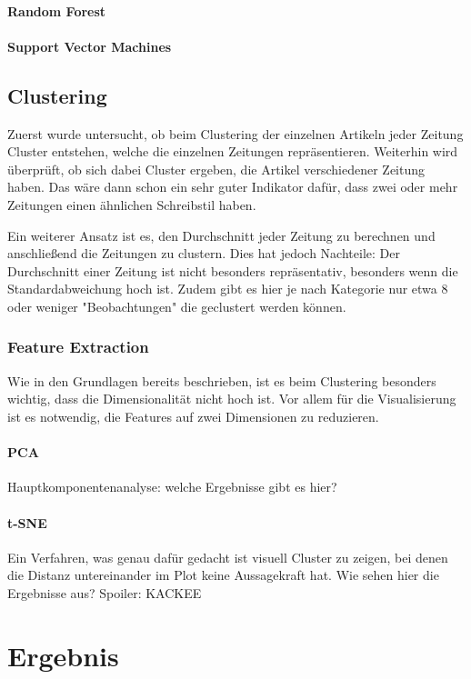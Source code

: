 \subsubsection*{Random Forest}
\subsubsection*{Support Vector Machines}
\section{Clustering}
Zuerst wurde untersucht, ob beim Clustering der einzelnen Artikeln jeder Zeitung Cluster entstehen, welche die einzelnen Zeitungen repräsentieren. Weiterhin wird überprüft, ob sich dabei Cluster ergeben, die Artikel verschiedener Zeitung haben. Das wäre dann schon ein sehr guter Indikator dafür, dass zwei oder mehr Zeitungen einen ähnlichen Schreibstil haben.

Ein weiterer Ansatz ist es, den Durchschnitt jeder Zeitung zu berechnen und anschließend die Zeitungen zu clustern. Dies hat jedoch Nachteile: Der Durchschnitt einer Zeitung ist nicht besonders repräsentativ, besonders wenn die Standardabweichung hoch ist. Zudem gibt es hier je nach Kategorie nur etwa 8 oder weniger "Beobachtungen" die geclustert werden können.
\subsection{Feature Extraction}
Wie in den Grundlagen bereits beschrieben, ist es beim Clustering besonders wichtig, dass die Dimensionalität nicht hoch ist. Vor allem für die Visualisierung ist es notwendig, die Features auf zwei Dimensionen zu reduzieren.
\subsubsection*{PCA}
Hauptkomponentenanalyse: welche Ergebnisse gibt es hier?
\subsubsection*{t-SNE}
Ein Verfahren, was genau dafür gedacht ist visuell Cluster zu zeigen, bei denen die Distanz untereinander im Plot keine Aussagekraft hat. Wie sehen hier die Ergebnisse aus? Spoiler: KACKEE

\chapter{Ergebnis}

